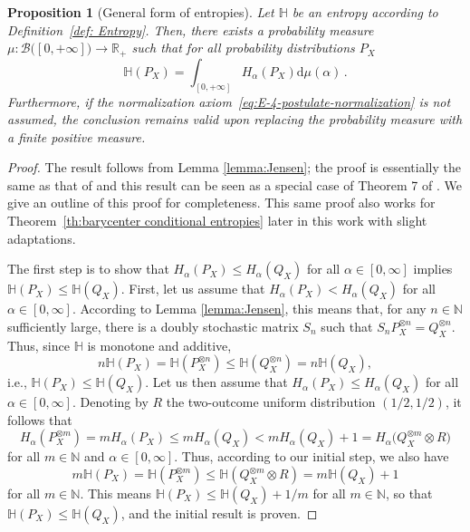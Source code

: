 \documentclass[aps,pra,11pt,onecolumn,nofootinbib,tightenlines]{revtex4-2}
\newtheorem{proposition}[theorem]{Proposition}
\theoremstyle{definition}
\def \d {\mathrm{d}}
\renewcommand{\H}{\mathbb{H}}
\newcommand{\mc}[1]{\mathcal{#1}}
\newcommand{\mb}[1]{\mathbb{#1}}
\begin{document}
\begin{proposition}[General form of entropies]\label{proposition:barycenter entropies}
Let $\H$ be an entropy according to Definition~\ref{def: Entropy}. Then, there exists a probability measure $\mu:\mc B\big([0,+\infty]\big)\to\mb R_+$ such that for all probability distributions $P_X$
\begin{equation}\label{eq:barycenter}
\H(P_X)=\int_{[0,+\infty]}H_\alpha(P_X)\d\mu(\alpha) \,.
\end{equation}
Furthermore, if the normalization axiom~\ref{eq:E-4-postulate-normalization} is not assumed, the conclusion remains valid upon replacing the probability measure with a finite positive measure.
\end{proposition}
\begin{proof}
    The result follows from Lemma \ref{lemma:Jensen}; the proof is essentially the same as that of \cite[Theorem 2]{mu21_renyi} and this result can be seen as a special case of Theorem 7 of \cite{haapasalo_inprep}. We give an outline of this proof for completeness. This same proof also works for Theorem~\ref{th:barycenter conditional entropies} later in this work with slight adaptations.

    The first step is to show that $H_\alpha(P_X)\leq H_\alpha(Q_X)$ for all $\alpha\in[0,\infty]$ implies $\mb H(P_X)\leq\mb H(Q_X)$. First, let us assume that $H_\alpha(P_X)< H_\alpha(Q_X)$ for all $\alpha\in[0,\infty]$. According to Lemma \ref{lemma:Jensen}, this means that, for any $n\in\mb N$ sufficiently large, there is a doubly stochastic matrix $S_n$ such that $S_nP_X^{\otimes n}=Q_X^{\otimes n}$. Thus, since $\mb H$ is monotone and additive,
    \begin{equation}
    n\mb H(P_X)=\mb H(P_X^{\otimes n})\leq\mb H(Q_X^{\otimes n})=n\mb H(Q_X),
    \end{equation}
    i.e., $\mb H(P_X)\leq\mb H(Q_X)$. Let us then assume that $H_\alpha(P_X)\leq H_\alpha(Q_X)$ for all $\alpha\in[0,\infty]$. Denoting by $R$ the two-outcome uniform distribution $(1/2,1/2)$, it follows that
    \begin{equation}
    H_\alpha(P_X^{\otimes m})=mH_\alpha(P_X)\leq mH_\alpha(Q_X)<mH_\alpha(Q_X)+1=H_\alpha(Q_X^{\otimes m}\otimes R\big)
    \end{equation}
    for all $m\in\mb N$ and $\alpha\in[0,\infty]$. Thus, according to our initial step, we also have
    \begin{equation}
    m\mb H(P_X)=\mb H(P_X^{\otimes m})\leq\mb H(Q_X^{\otimes m}\otimes R)=m\mb H(Q_X)+1
    \end{equation}
    for all $m\in\mb N$. This means $\mb H(P_X)\leq\mb H(Q_X)+1/m$ for all $m\in\mb N$, so that $\mb H(P_X)\leq\mb H(Q_X)$, and the initial result is proven.


\end{proof}
\end{document}
